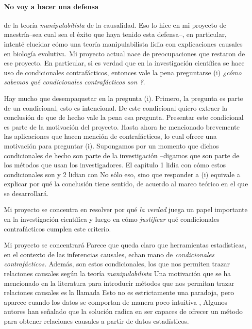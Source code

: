 \paragraph{No voy a hacer una defensa} de la teoría
\emph{manipulabilista} de la causalidad. Eso lo hice en mi proyecto
de maestría--sea cual sea el éxito que haya tenido esta defensa--,
en particular, intenté elucidar cómo una teoría manipulabilista
lidia con explicaciones causales en biología evolutiva. Mi
proyecto actual nace de preocupaciones que restaron de ese proyecto.
En particular, si es verdad que en la investigación científica se
hace uso de condicionales contrafácticos, entonces vale la pena
preguntarse (i) \emph{¿cómo sabemos qué condicionales contrafácticos son ?}.

Hay mucho que desempaquetar en la pregunta (i). Primero, la
pregunta es parte de un condicional, esto es intencional. De este
condicional quiero extraer la conclusión de que de hecho vale la
pena esa pregunta. Presentar este condicional es parte de la motivación del proyecto. Hasta ahora he mencionado brevemente las aplicaciones que hacen mención de contrafácticos, lo cual ofrece una motivación para preguntar (i). Supongamos por un momento que dichos condicionales de hecho son parte de la investigación --digamos que son parte de los métodos que usan los investigadores. El capítulo 1 lidia con cómo estos condicionales son  y 2 lidian con   No sólo eso, sino que responder a (i) equivale a explicar por qué la conclusión tiene sentido, de acuerdo al marco teórico en el que se desarrollará.

Mi proyecto se concentra en resolver por qué \emph{la verdad} juega un papel importante en la investigación científica y luego en cómo \emph{justificar} qué condicionales contrafácticos cumplen este criterio.

Mi proyecto se concentrará Parece que queda claro que herramientas estadísticas, en el contexto de las inferencias causales, echan mano de \emph{condicionales contrafácticos.}
Además, son estos condicionales, los que nos permiten trazar relaciones causales según la teoría \emph{manipulabilista}
Una motivación que se ha mencionado en la literatura para introducir métodos que nos permitan trazar relaciones causales es la llamada 
Esto no es estrictamente una paradoja, pero aparece cuando los datos se comportan de manera poco intuitiva \parencite[p.~13]{Hajek2016-HAJOHO},
Algunos autores han señalado que la solución radica en ser capaces de ofrecer un método para obtener relaciones causales a partir de datos estadísticos.

